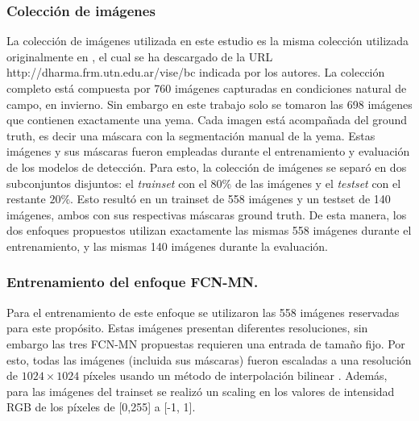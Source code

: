 \documentclass[a4paper,authoryear,review]{elsarticle}
\begin{document}
\subsubsection{Colección de imágenes}
\label{sec:collection}

La colección de imágenes utilizada en este estudio es la misma colección utilizada originalmente en \citet{perez2017image}, el cual se ha descargado de la URL http://dharma.frm.utn.edu.ar/vise/bc indicada por los autores. La colección completo está compuesta por 760 imágenes capturadas en condiciones natural de campo, en invierno. Sin embargo en este trabajo solo se tomaron las 698 imágenes que contienen exactamente una yema. Cada imagen está acompañada del ground truth, es decir una máscara con la segmentación manual de la yema. Estas imágenes y sus máscaras fueron empleadas durante el entrenamiento y evaluación de los modelos de detección. Para esto, la colección de imágenes se separó en dos subconjuntos disjuntos: el \emph{trainset} con el $80\%$ de las imágenes y el \emph{testset} con el restante $20\%$. Esto resultó en un trainset de 558 imágenes y un testset de 140 imágenes, ambos con sus respectivas máscaras ground truth. De esta manera, los dos enfoques propuestos utilizan exactamente las mismas 558 imágenes durante el entrenamiento, y las mismas 140 imágenes durante la evaluación.


\subsubsection{Entrenamiento del enfoque FCN-MN.} 
\label{sec:fcntrain}

Para el entrenamiento de este enfoque se utilizaron las 558 imágenes reservadas para este propósito. Estas imágenes presentan diferentes resoluciones, sin embargo las tres FCN-MN propuestas requieren una entrada de tamaño fijo. Por esto, todas las imágenes (incluida sus máscaras) fueron escaladas a una resolución de $1024 \times 1024$ píxeles usando un método de interpolación bilinear \citep{han2013comparison}. Además, para las imágenes del trainset se realizó un scaling en los valores de intensidad RGB de los píxeles de [0,255] a [-1, 1].
\end{document}
